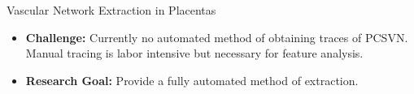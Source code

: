 \documentclass[9pt,notes]{beamer}
\begin{document}
\begin{frame}
\begin{columns}[c]
\begin{column}{0.5\textwidth}
\begin{block}{Vascular Network Extraction in Placentas}
\begin{itemize}
					\item \textbf{Challenge:}
						Currently no automated method of obtaining traces of
            PCSVN. Manual tracing is labor intensive but necessary
            for feature analysis.
					\item \textbf{Research Goal:} Provide a fully automated method of extraction.
          					\end{itemize}
			\end{block}
		\end{column}
	\end{columns}
\end{frame}
\end{document}

